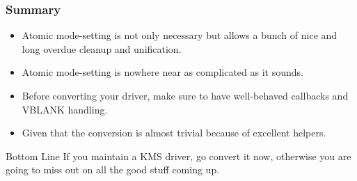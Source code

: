 \documentclass[t]{beamer}
\begin{document}
\begin{frame}
	\frametitle{Summary}
	\begin{itemize}
		\item Atomic mode-setting is not only necessary but allows a bunch of
			nice and long overdue cleanup and unification.
		\item Atomic mode-setting is nowhere near as complicated as it sounds.
		\item Before converting your driver, make sure to have well-behaved
			callbacks and VBLANK handling.
		\item Given that the conversion is almost trivial because of excellent
			helpers.
	\end{itemize}
	\begin{block}{Bottom Line}
		If you maintain a KMS driver, go convert it now, otherwise you
		are going to miss out on all the good stuff coming up.
	\end{block}
\end{frame}
\end{document}
